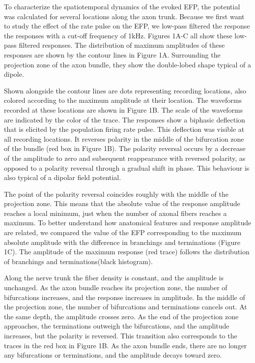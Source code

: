 \documentclass[]{article}
\begin{document}
To characterize the spatiotemporal dynamics of the evoked EFP, the
potential was calculated for several locations along the axon trunk.
Because we first want to study the effect of the rate pulse on the EFP,
we low-pass filtered the response the responses with a cut-off frequency
of 1kHz. Figures 1A-C all show these low-pass filtered responses. The
distribution of maximum amplitudes of these responses are shown by the
contour lines in Figure 1A. Surrounding the projection zone of the axon
bundle, they show the double-lobed shape typical of a dipole.

Shown alongside the contour lines are dots representing recording
locations, also colored according to the maximum amplitude at their
location. The waveforms recorded at these locations are shown in Figure
1B. The scale of the waveforms are indicated by the color of the trace.
The responses show a biphasic deflection that is elicited by the
population firing rate pulse. This deflection was visible at all
recording locations. It reverses polarity in the middle of the
bifurcation zone of the bundle (red box in Figure 1B). The polarity
reversal occurs by a decrease of the amplitude to zero and subsequent
reappearance with reversed polarity, as opposed to a polarity reversal
through a gradual shift in phase. This behaviour is also typical of a
dipolar field potential.

The point of the polarity reversal coincides roughly with the middle of
the projection zone. This means that the absolute value of the response
amplitude reaches a local minimum, just when the number of axonal fibers
reaches a maximum. To better understand how anatomical features and
response amplitude are related, we compared the value of the EFP
corresponding to the maximum absolute amplitude with the difference in
branchings and terminations (Figure 1C). The amplitude of the maximum
response (red trace) follows the distribution of branchings and
terminations(black histogram).

Along the nerve trunk the fiber density is constant, and the amplitude
is unchanged. As the axon bundle reaches its projection zone, the number
of bifurcations increases, and the response increases in amplitude. In
the middle of the projection zone, the number of bifurcations and
terminations cancels out. At the same depth, the amplitude crosses zero.
As the end of the projection zone approaches, the terminations outweigh
the bifurcations, and the amplitude increases, but the polarity is
reversed. This transition also corresponds to the traces in the red box
in Figure 1B. As the axon bundle ends, there are no longer any
bifurcations or terminations, and the amplitude decays toward zero.
\end{document}
